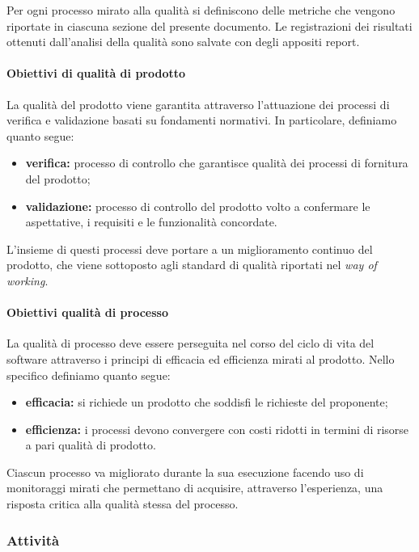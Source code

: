 		Per ogni processo mirato alla qualità si definiscono delle metriche che vengono riportate in ciascuna sezione del presente documento.
		Le registrazioni dei risultati ottenuti dall'analisi della qualità sono salvate con degli appositi report.

		\paragraph{Obiettivi di qualità di prodotto}

			La qualità del prodotto viene garantita attraverso l'attuazione dei processi di verifica e validazione basati su fondamenti normativi. In particolare, definiamo quanto segue:
			\begin{itemize}
				\item \textbf{verifica:} processo di controllo che garantisce qualità dei processi di fornitura del prodotto;
				\item \textbf{validazione:} processo di controllo del prodotto volto a confermare le aspettative, i requisiti e le funzionalità concordate.
			\end{itemize}

			L'insieme di questi processi deve portare a un miglioramento continuo del prodotto, che viene sottoposto agli standard di qualità riportati nel \textit{way of working}.

		\paragraph{Obiettivi qualità di processo}

			La qualità di processo deve essere perseguita nel corso del ciclo di vita del software attraverso i principi di efficacia ed efficienza mirati al prodotto.
			Nello specifico definiamo quanto segue:
			\begin{itemize}
				\item \textbf{efficacia:} si richiede un prodotto che soddisfi le richieste del proponente;
				\item \textbf{efficienza:} i processi devono convergere con costi ridotti in termini di risorse a pari qualità di prodotto.
			\end{itemize}

			Ciascun processo va migliorato durante la sua esecuzione facendo uso di monitoraggi mirati che permettano di acquisire, attraverso l'esperienza, una risposta critica alla qualità stessa del processo.

	\subsubsection{Attività}

